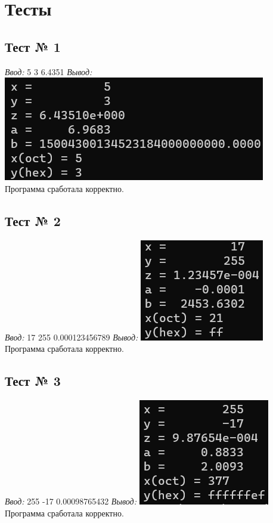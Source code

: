 \documentclass[12pt]{article}
\begin{document}
	\newpage
	
	\section*{Тесты}
	
	\subsection*{Тест № 1}
	\textit{Ввод:} 5 3 6.4351 \newline
	\textit{Вывод:}
	\vspace{6px}
	\newline
	\includegraphics{test_1}
	\vspace{3px}
	\newline
	Программа сработала корректно.
	
	\subsection*{Тест № 2}
	\textit{Ввод:} 17 255 0.000123456789 \newline
	\textit{Вывод:}
	\vspace{6px}
	\newline
	\includegraphics{test_2}
	\vspace{3px}
	\newline
	Программа сработала корректно.
	
	\subsection*{Тест № 3}
	\textit{Ввод:} 255 -17 0.00098765432 \newline
	\textit{Вывод:}
	\vspace{6px}
	\newline
	\includegraphics{test_3}
	\vspace{3px}
	\newline
	Программа сработала корректно.
	
	 
	
\end{document}
